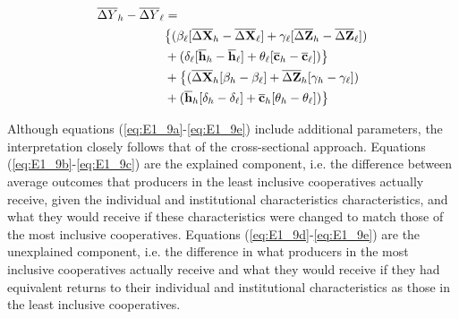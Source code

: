 \documentclass[11pt]{article}
\begin{document}
\begin{subequations}
    \begin{align}
        \overline{\Delta Y}_{h} - \overline{\Delta Y}_{\ell} &= \label{eq:E1_9a} \\ 
        &\big{\{}(\beta_{\ell}[\overline{\Delta \mathbf{X}}_{h} - \overline{\Delta \mathbf{X}}_{\ell}] + \gamma_{\ell}[\overline{\Delta \mathbf{Z}}_{h} - \overline{\Delta \mathbf{Z}}_{\ell}]) \label{eq:E1_9b} \\
        &+ (\delta_{\ell}[\overline{\mathbf{h}}_{h} - \overline{\mathbf{h}}_{\ell}] + \theta_{\ell}[\overline{\mathbf{c}}_{h} - \overline{\mathbf{c}}_{\ell}])\big{\}} \label{eq:E1_9c} \\
        &+ \big{\{}(\overline{\Delta \mathbf{X}}_{h}[\beta_{h} - \beta_{\ell}] + \overline{\Delta \mathbf{Z}}_{h}[\gamma_{h} - \gamma_{\ell}]) \label{eq:E1_9d} \\
        &+ (\overline{\mathbf{h}}_{h}[\delta_{h} - \delta_{\ell}] + \overline{\mathbf{c}}_{h}[\theta_{h} - \theta_{\ell}])\big{\}} \label{eq:E1_9e}
    \end{align}
\end{subequations}  

Although equations (\ref{eq:E1_9a}-\ref{eq:E1_9e}) include additional parameters, the interpretation closely follows that of the cross-sectional approach. Equations (\ref{eq:E1_9b}-\ref{eq:E1_9c}) are the explained component, i.e. the difference between average outcomes that producers in the least inclusive cooperatives actually receive, given the individual and institutional characteristics characteristics, and what they would receive if these characteristics were changed to match those of the most inclusive cooperatives. Equations (\ref{eq:E1_9d}-\ref{eq:E1_9e}) are the unexplained component, i.e. the difference in what producers in the most inclusive cooperatives actually receive and what they would receive if they had equivalent returns to their individual and institutional characteristics as those in the least inclusive cooperatives.

\end{document}
